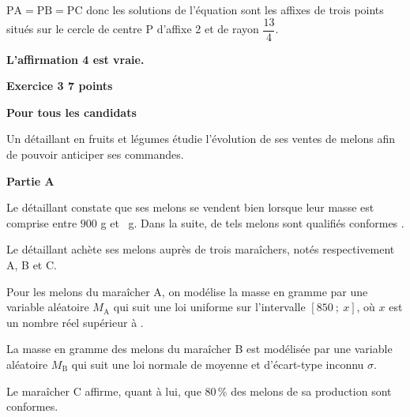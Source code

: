 \documentclass[10pt]{article}
\begin{document}
\begin{enumerate}
\begin{list}{\textbullet}{}
\item $\mathrm{PA} = \mathrm{PB} = \mathrm{PC}$ donc les solutions de l'équation sont les affixes de trois points situés sur le cercle de centre P d'affixe 2 et de rayon $\dfrac{13}{4}$.

\end{list}
\textbf{L'affirmation 4 est vraie.}

\end{enumerate}

\vspace{0.5cm}

\textbf{\large{Exercice 3} \hfill 7 points}
 
\textbf{Pour tous les candidats}

%

\medskip

Un détaillant en fruits et légumes étudie l'évolution de ses ventes de melons afin de pouvoir
anticiper ses commandes.

\bigskip

\textbf{Partie A}

\medskip

Le détaillant constate que ses melons se vendent bien lorsque leur masse est comprise entre $900$ g et ~g. Dans la suite, de tels melons sont qualifiés \og conformes \fg.

Le détaillant achète ses melons auprès de trois maraîchers, notés respectivement A, B et C.

Pour les melons du maraîcher A, on modélise la masse en gramme par une variable aléatoire $M_{\text{A}}$ qui suit une loi uniforme sur l'intervalle $[850~;~x]$, où $x$ est un nombre réel supérieur à .

La masse en gramme des melons du maraîcher B est modélisée par une variable aléatoire $M_{\text{B}}$ qui suit une loi normale de moyenne  et d'écart-type inconnu $\sigma$.

Le maraîcher C affirme, quant à lui, que 80\,\% des melons de sa production sont conformes.

\medskip
\end{document}
